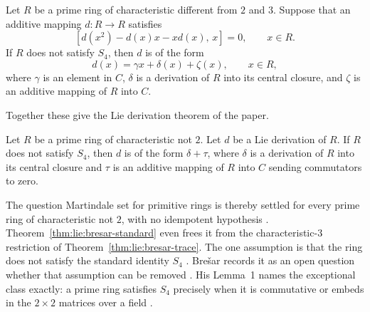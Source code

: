 \begin{theorem}\label{thm:lie:bresar-trace}
Let $R$ be a prime ring of characteristic different from $2$ and $3$. Suppose that
an additive mapping $d\colon R\to R$ satisfies
\[
[d(x^{2})-d(x)x-xd(x),\,x]=0,\qquad x\in R.
\]
If $R$ does not satisfy $S_{4}$, then $d$ is of the form
\[
d(x)=\gamma x+\delta(x)+\zeta(x),\qquad x\in R,
\]
where $\gamma$ is an element in $C$, $\delta$ is a derivation of $R$ into its
central closure, and $\zeta$ is an additive mapping of $R$ into $C$.
\end{theorem}

Together these give the Lie derivation theorem of the paper. %

\begin{theorem}\label{thm:lie:bresar-standard}
Let $R$ be a prime ring of characteristic not $2$. Let $d$ be a Lie derivation of
$R$. If $R$ does not satisfy $S_{4}$, then $d$ is of the form $\delta+\tau$, where
$\delta$ is a derivation of $R$ into its central closure and $\tau$ is an additive
mapping of $R$ into $C$ sending commutators to zero.
\end{theorem}

The question Martindale set for primitive rings is thereby settled for every prime
ring of characteristic not $2$, with no idempotent hypothesis
\cite[Theorem~5, p.~529]{Bresar1993LieTAMS}. Theorem~\ref{thm:lie:bresar-standard}
even frees it from the characteristic-$3$ restriction of Theorem~\ref{thm:lie:bresar-trace}.
The one assumption is that the ring does not satisfy the standard identity
$S_{4}$ \cite[Theorem~5, p.~529]{Bresar1993LieTAMS}. %
Brešar records it as an open question whether that assumption can be removed
\cite[p.~528]{Bresar1993LieTAMS}. His
Lemma~1 names the exceptional class exactly: a prime ring satisfies $S_{4}$
precisely when it is commutative or embeds in the $2\times2$ matrices over a
field \cite[Lemma~1, p.~530]{Bresar1993LieTAMS}.
